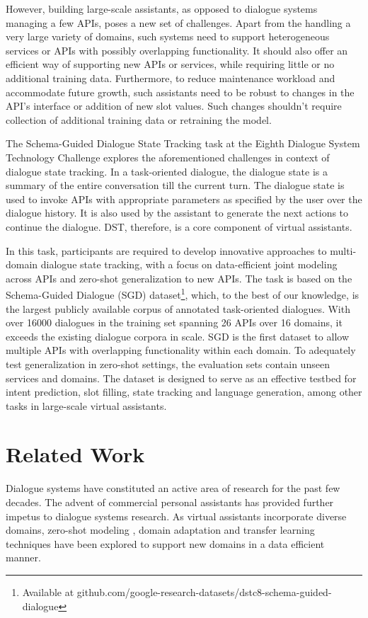However, building large-scale assistants, as opposed to dialogue systems managing a few APIs, poses a new set of challenges. Apart from the handling a very large variety of domains, such systems need to support heterogeneous services or APIs with possibly overlapping functionality.  It should also offer an efficient way of supporting new APIs or services, while requiring little or no additional training data. Furthermore, to reduce maintenance workload and accommodate future growth, such assistants need to be robust to changes in the API's interface or addition of new slot values. Such changes shouldn't require collection of additional training data or retraining the model.

The Schema-Guided Dialogue State Tracking task at the Eighth Dialogue System Technology Challenge explores the aforementioned challenges in context of dialogue state tracking. In a task-oriented dialogue, the dialogue state is a summary of the entire conversation till the current turn. The dialogue state is used to invoke APIs with appropriate parameters as specified by the user over the dialogue history. It is also used by the assistant to generate the next actions to continue the dialogue. DST, therefore, is a core component of virtual assistants. 

In this task, participants are required to develop innovative approaches to multi-domain dialogue state tracking, with a focus on data-efficient joint modeling across APIs and zero-shot generalization to new APIs. The task is based on the Schema-Guided Dialogue (SGD) dataset\footnote{Available at github.com/google-research-datasets/dstc8-schema-guided-dialogue}, which, to the best of our knowledge, is the largest publicly available corpus of annotated task-oriented dialogues. With over 16000 dialogues in the training set spanning 26 APIs over 16 domains, it exceeds the existing dialogue corpora in scale. SGD is the first dataset to allow multiple APIs with overlapping functionality within each domain. To adequately test generalization in zero-shot settings, the evaluation sets contain unseen services and domains. The dataset is designed to serve as an effective testbed for intent prediction, slot filling, state tracking and language generation, among other tasks in large-scale virtual assistants.

\section{Related Work}
Dialogue systems have constituted an active area of research for the past few decades. The advent of commercial personal assistants has provided further impetus to dialogue systems research. As virtual assistants incorporate diverse domains, zero-shot modeling \cite{bapna2017towards,xia2018zero,shah-etal-2019-robust}, domain adaptation and transfer learning techniques \cite{yang2017transfer,rastogi2017scalable,zhu2018concept} have been explored to support new domains in a data efficient manner.

